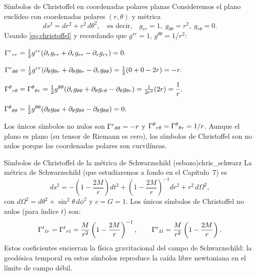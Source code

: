 \begin{ejemplo}{Símbolos de Christoffel en coordenadas polares planas}{}
Consideremos el plano euclídeo con coordenadas polares $(r, \theta)$ y métrica
\[
  ds^2 = dr^2 + r^2\, d\theta^2,
  \quad\text{es decir,}\quad
  g_{rr} = 1,\; g_{\theta\theta} = r^2,\; g_{r\theta} = 0.
\]
Usando \eqref{eq:christoffel} y recordando que $g^{rr} = 1$, $g^{\theta\theta} = 1/r^2$:

$\Gamma^{r}{}_{r r} = \tfrac{1}{2}g^{rr}(\partial_r g_{rr} + \partial_r g_{rr} - \partial_r g_{rr}) = 0.$

$\Gamma^{r}{}_{\theta \theta} = \tfrac{1}{2}g^{rr}(\partial_\theta g_{\theta r} + \partial_\theta g_{\theta r} - \partial_r g_{\theta\theta}) = \tfrac{1}{2}(0 + 0 - 2r) = -r.$

$\Gamma^{\theta}{}_{r \theta} = \Gamma^{\theta}{}_{\theta r} = \tfrac{1}{2}g^{\theta\theta}(\partial_r g_{\theta\theta} + \partial_\theta g_{r\theta} - \partial_\theta g_{\theta r}) = \tfrac{1}{2r^2}(2r) = \dfrac{1}{r}.$

$\Gamma^{\theta}{}_{\theta \theta} = \tfrac{1}{2}g^{\theta\theta}(\partial_\theta g_{\theta\theta} + \partial_\theta g_{\theta\theta} - \partial_\theta g_{\theta\theta}) = 0.$

Los únicos símbolos no nulos son $\Gamma^{r}{}_{\theta \theta} = -r$ y $\Gamma^{\theta}{}_{r \theta} = \Gamma^{\theta}{}_{\theta r} = 1/r$. Aunque el plano es plano (su tensor de Riemann es cero), los símbolos de Christoffel son no nulos porque las coordenadas polares son curvilíneas.
\end{ejemplo}

\begin{ejemplo}{Símbolos de Christoffel de la métrica de Schwarzschild (esbozo)}{chris_schwarz}
La métrica de Schwarzschild (que estudiaremos a fondo en el Capítulo~7) es
\[
  ds^2 = -\!\left(1-\frac{2M}{r}\right)dt^2
         + \left(1-\frac{2M}{r}\right)^{-1}\!dr^2
         + r^2\,d\Omega^2,
\]
con $d\Omega^2 = d\theta^2 + \sin^2\theta\, d\phi^2$ y $c = G = 1$. Los únicos símbolos de Christoffel no nulos (para índice $t$) son:
\[
  \Gamma^{t}{}_{t r} = \Gamma^{t}{}_{r t} = \frac{M}{r^2}\left(1-\frac{2M}{r}\right)^{-1},
  \qquad
  \Gamma^{r}{}_{t t} = \frac{M}{r^2}\left(1-\frac{2M}{r}\right).
\]
Estos coeficientes encierran la física gravitacional del campo de Schwarzschild: la geodésica temporal en estos símbolos reproduce la caída libre newtoniana en el límite de campo débil.
\end{ejemplo}

